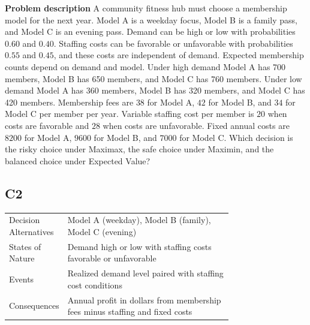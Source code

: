 \begin{ExamProblems}
		\item
		\textbf{Problem description}
		A community fitness hub must choose a membership model for the next year. Model A is a weekday focus, Model B is a family pass, and Model C is an evening pass. Demand can be high or low with probabilities $0.60$ and $0.40$. Staffing costs can be favorable or unfavorable with probabilities $0.55$ and $0.45$, and these costs are independent of demand. Expected membership counts depend on demand and model. Under high demand Model A has 700 members, Model B has 650 members, and Model C has 760 members. Under low demand Model A has 360 members, Model B has 320 members, and Model C has 420 members. Membership fees are $38$ for Model A, $42$ for Model B, and $34$ for Model C per member per year. Variable staffing cost per member is $20$ when costs are favorable and $28$ when costs are unfavorable. Fixed annual costs are $8200$ for Model A, $9600$ for Model B, and $7000$ for Model C. Which decision is the risky choice under Maximax, the safe choice under Maximin, and the balanced choice under Expected Value?

		\subsection*{C2}
		\begin{center}
			\begin{tabular}{l p{0.74\linewidth}}
				\toprule
				Decision Alternatives & Model A (weekday), Model B (family), Model C (evening) \\
				States of Nature & Demand high or low with staffing costs favorable or unfavorable \\
				Events & Realized demand level paired with staffing cost conditions \\
				Consequences & Annual profit in dollars from membership fees minus staffing and fixed costs \\
				\bottomrule
			\end{tabular}
		\end{center}


\end{ExamProblems}
